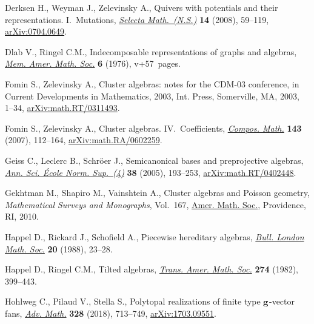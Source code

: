 \documentclass[pdftex]{sigma}
\numberwithin{equation}{section}
\begin{document}
\begin{thebibliography}{99}
Derksen H., Weyman J., Zelevinsky A., Quivers with potentials and their
 representations. {I}.~{M}utations, \href{https://doi.org/10.1007/s00029-008-0057-9}{\textit{Selecta Math.~(N.S.)}} \textbf{14}
 (2008), 59--119, \href{https://arxiv.org/abs/0704.0649}{arXiv:0704.0649}.

Dlab V., Ringel C.M., Indecomposable representations of graphs and algebras,
 \href{https://doi.org/10.1090/memo/0173}{\textit{Mem. Amer. Math. Soc.}} \textbf{6} (1976), v+57~pages.

Fomin S., Zelevinsky A., Cluster algebras: notes for the {CDM}-03 conference,
 in Current Developments in Mathematics, 2003, Int. Press, Somerville, MA,
 2003, 1--34, \href{https://arxiv.org/abs/math.RT/0311493}{arXiv:math.RT/0311493}.

Fomin S., Zelevinsky A., Cluster algebras. {IV}.~{C}oefficients,
 \href{https://doi.org/10.1112/S0010437X06002521}{\textit{Compos. Math.}} \textbf{143} (2007), 112--164,
 \href{https://arxiv.org/abs/math.RA/0602259}{arXiv:math.RA/0602259}.

Geiss C., Leclerc B., Schr\"oer J., Semicanonical bases and preprojective
 algebras, \href{https://doi.org/10.1016/j.ansens.2004.12.001}{\textit{Ann. Sci. \'Ecole Norm. Sup.~(4)}} \textbf{38} (2005),
 193--253, \href{https://arxiv.org/abs/math.RT/0402448}{arXiv:math.RT/0402448}.

Gekhtman M., Shapiro M., Vainshtein A., Cluster algebras and {P}oisson
 geometry, \textit{Mathematical Surveys and Monographs}, Vol.~167, \href{https://doi.org/10.1090/surv/167}{Amer. Math.
 Soc.}, Providence, RI, 2010.

Happel D., Rickard J., Schofield A., Piecewise hereditary algebras,
 \href{https://doi.org/10.1112/blms/20.1.23}{\textit{Bull. London Math. Soc.}} \textbf{20} (1988), 23--28.

Happel D., Ringel C.M., Tilted algebras, \href{https://doi.org/10.2307/1999116}{\textit{Trans. Amer. Math. Soc.}}
 \textbf{274} (1982), 399--443.

Hohlweg C., Pilaud V., Stella S., Polytopal realizations of finite type {${\bf
 g}$}-vector fans, \href{https://doi.org/10.1016/j.aim.2018.01.019}{\textit{Adv. Math.}} \textbf{328} (2018), 713--749,
 \href{https://arxiv.org/abs/1703.09551}{arXiv:1703.09551}.


\end{thebibliography}
\end{document}
